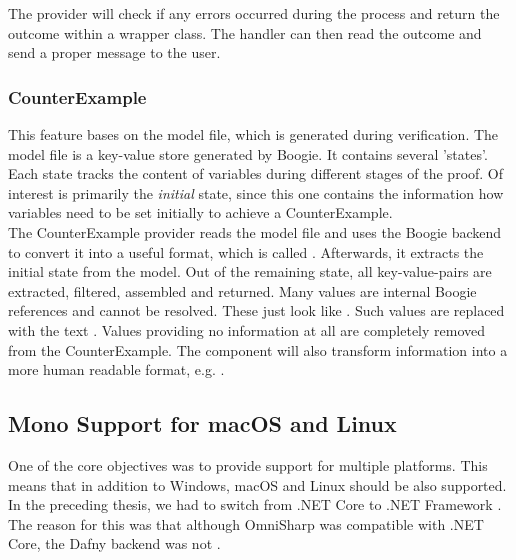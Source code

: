 The provider will check if any errors occurred during the process and return the outcome within a wrapper class.
The handler can then read the outcome and send a proper message to the user.

\subsubsection{CounterExample}
This feature bases on the model file, which is generated during verification.
The model file is a key-value store generated by Boogie.
It contains several 'states'.
Each state tracks the content of variables during different stages of the proof.
Of interest is primarily the \textit{initial} state, since this one contains the information how variables
need to be set initially to achieve a CounterExample.\\

The CounterExample provider reads the model file and uses the Boogie backend to convert it into a useful format, which is called .
Afterwards, it extracts the initial state from the model.
Out of the remaining state, all key-value-pairs are extracted, filtered, assembled and returned.
Many values are internal Boogie references and cannot be resolved.
These just look like .
Such values are replaced with the text .
Values providing no information at all are completely removed from the CounterExample.
The component will also transform information into a more human readable format, e.g. .\\






\subsection{Mono Support for macOS and Linux}
\label{section:implementation:mono}
One of the core objectives was to provide support for multiple platforms.
This means that in addition to Windows, macOS and Linux should be also supported. \\

In the preceding thesis, we had to switch from .NET Core to .NET Framework \cite{sa}.
The reason for this was that although OmniSharp was compatible with .NET Core,
the Dafny backend was not \cite{sa}.\\

